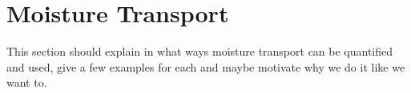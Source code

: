 % 	
% 
% 
% 




\section{Moisture Transport}

This section should explain in what ways moisture transport can be quantified and used, give a few examples for each and maybe motivate  why we do it like we want to. 


